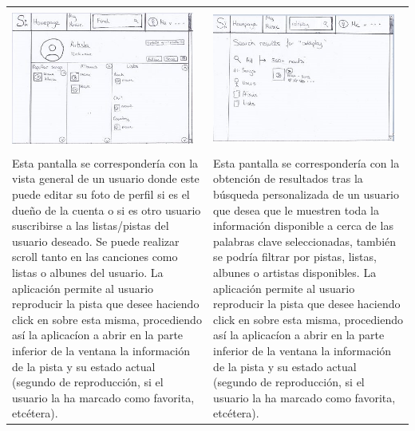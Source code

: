 \begin{tabular}{ p{6cm} p{6cm}}
	\hline
	\\
	\includegraphics[width=6cm]{Figures/web/Artist-web.png}
	&
	\includegraphics[width=6cm]{Figures/web/search-web.png} \\
	\hline
	\\
	Esta pantalla se correspondería con la vista general de un usuario donde este puede editar su foto de perfil si es el dueño de la cuenta o si es otro usuario suscribirse a las listas/pistas del usuario deseado.
	Se puede realizar scroll tanto en las canciones como listas o albunes del usuario.
	La aplicación permite al usuario reproducir la pista que desee haciendo click en sobre esta misma, procediendo así la aplicacíon a abrir en la parte inferior de la ventana la información de la pista y su estado actual (segundo de reproducción, si el usuario la ha marcado como favorita, etcétera).
	&
	Esta pantalla se correspondería con la obtención de resultados tras la búsqueda personalizada de un usuario que desea que le muestren toda la información disponible a cerca de las palabras clave seleccionadas, también se podría filtrar por pistas, listas, albunes o artistas disponibles.
	La aplicación permite al usuario reproducir la pista que desee haciendo click en sobre esta misma, procediendo así la aplicacíon a abrir en la parte inferior de la ventana la información de la pista y su estado actual (segundo de reproducción, si el usuario la ha marcado como favorita, etcétera).
	\\
	\hline
\end{tabular}